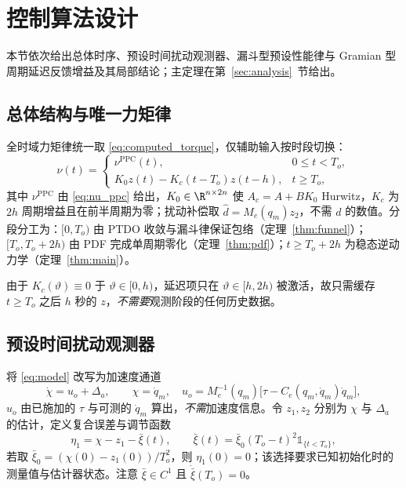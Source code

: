 \section{控制算法设计}
\label{sec:controller}

本节依次给出总体时序、预设时间扰动观测器、漏斗型预设性能律与 Gramian 型周期延迟反馈增益及其局部结论；主定理在第~\ref{sec:analysis}~节给出。

\subsection{总体结构与唯一力矩律}
\label{sec:structure}

全时域力矩律统一取 \eqref{eq:computed_torque}，仅辅助输入按时段切换：
\begin{equation}
\nu(t)=
\begin{cases}
\nu^{\mathrm{PPC}}(t), & 0\le t<T_o,\\[2pt]
K_0z(t)-K_c(t-T_o)z(t-h), & t\ge T_o,
\end{cases}
\label{eq:nu_schedule}
\end{equation}
其中 \(\nu^{\mathrm{PPC}}\) 由 \eqref{eq:nu_ppc} 给出，\(K_0\in\R^{n\times2n}\) 使 \(A_c=A+BK_0\) Hurwitz，\(K_c\) 为 \(2h\) 周期增益且在前半周期为零；扰动补偿取 \(\hat d=M_e(q_m)z_2\)，不需 \(d\) 的数值。分段分工为：\([0,T_o)\) 由 PTDO 收敛与漏斗律保证包络（定理~\ref{thm:funnel}）；\([T_o,T_o+2h)\) 由 PDF 完成单周期零化（定理~\ref{thm:pdf}）；\(t\ge T_o+2h\) 为稳态逆动力学（定理~\ref{thm:main}）。

由于 \(K_c(\vartheta)\equiv0\) 于 \(\vartheta\in[0,h)\)，延迟项只在 \(\vartheta\in[h,2h)\) 被激活，故只需缓存 \(t\ge T_o\) 之后 \(h\) 秒的 \(z\)，\emph{不需要}观测阶段的任何历史数据。

\subsection{预设时间扰动观测器}
\label{sec:ptdo}

将 \eqref{eq:model} 改写为加速度通道
\begin{equation}
\dot\chi=u_o+\Delta_a,\qquad
\chi=\dot q_m,\quad
u_o=M_e^{-1}(q_m)\bigl[\tau-C_e(q_m,\dot q_m)\dot q_m\bigr],
\label{eq:observer_channel}
\end{equation}
\(u_o\) 由已施加的 \(\tau\) 与可测的 \(\dot q_m\) 算出，\emph{不需}加速度信息。令 \(z_1,z_2\) 分别为 \(\chi\) 与 \(\Delta_a\) 的估计，定义复合误差与调节函数
\begin{equation}
\eta_1=\chi-z_1-\bar\xi(t),\qquad
\bar\xi(t)=\bar\xi_0(T_o-t)^2\mathbb 1_{\{t<T_o\}},
\label{eq:observer_error}
\end{equation}
若取 \(\bar\xi_0=(\chi(0)-z_1(0))/T_o^2\)，则 \(\eta_1(0)=0\)；该选择要求已知初始化时的测量值与估计器状态。注意 \(\bar\xi\in C^{1}\) 且 \(\dot{\bar\xi}(T_o)=0\)。

